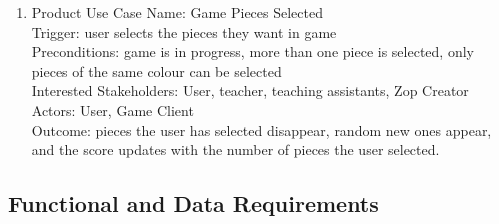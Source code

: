 \documentclass[12pt]{article}
\begin{document}
\begin{enumerate}
 \item Product Use Case Name: Game Pieces Selected\\
 Trigger: user selects the pieces they want in game\\
 Preconditions: game is in progress, more than one piece is selected, only pieces of the same colour can be selected\\
 Interested Stakeholders: User, teacher, teaching assistants, Zop Creator\\
 Actors: User, Game Client\\
 Outcome: pieces the user has selected disappear, random new ones appear, and the score updates with the number of pieces the user selected.\\

\end{enumerate}
\subsection{Functional and Data Requirements}
\end{document}
